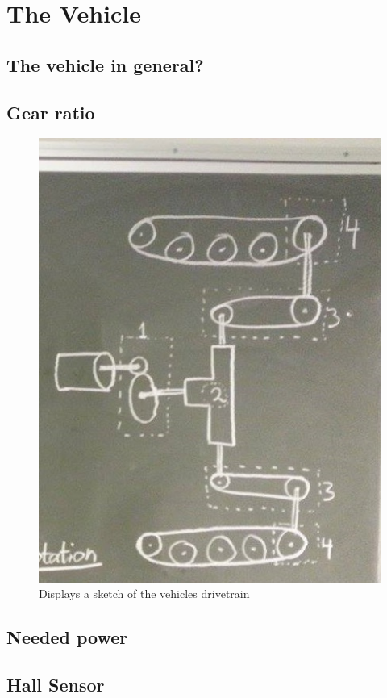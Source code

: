 \section{The Vehicle}

\subsection{The vehicle in general?}

\subsection{Gear ratio}


 \begin{figure}[H]
	\centering
	\includegraphics[scale=0.8]{figures/Drivetrain.jpg}
	\caption{Displays a sketch of the vehicles drivetrain}
	\label{fig:Drivetrain}
\end{figure}

\subsection{Needed power}

\subsection{Hall Sensor}


